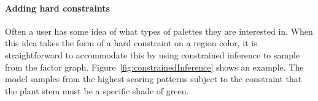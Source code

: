 
\paragraph{Adding hard constraints} Often a user has some idea of what types of palettes they are interested in. When this idea takes the form of a hard constraint on a region color, it is straightforward to accommodate this by using constrained inference to sample from the factor graph. Figure~\ref{fig:constrainedInference} shows an example. The model samples from the highest-scoring patterns subject to the constraint that the plant stem must be a specific shade of green.

